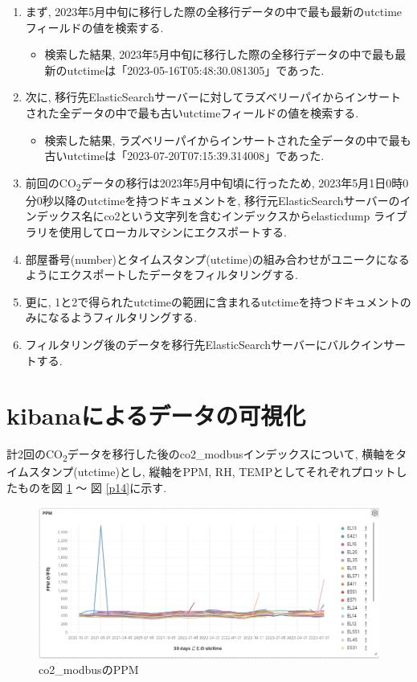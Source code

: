 \begin{enumerate}
    \item まず, 2023年5月中旬に移行した際の全移行データの中で最も最新のutctimeフィールドの値を検索する.
          \begin{itemize}
              \item 検索した結果, 2023年5月中旬に移行した際の全移行データの中で最も最新のutctimeは「2023-05-16T05:48:30.081305」であった.
          \end{itemize}
    \item 次に, 移行先ElasticSearchサーバーに対してラズベリーパイからインサートされた全データの中で最も古いutctimeフィールドの値を検索する.
          \begin{itemize}
              \item 検索した結果, ラズベリーパイからインサートされた全データの中で最も古いutctimeは「2023-07-20T07:15:39.314008」であった.
          \end{itemize}
    \item 前回のCO\textsubscript{2}データの移行は2023年5月中旬頃に行ったため, 2023年5月1日0時0分0秒以降のutctimeを持つドキュメントを, 移行元ElasticSearchサーバーのインデックス名にco2という文字列を含むインデックスからelasticdump \cite{1}ライブラリを使用してローカルマシンにエクスポートする.
    \item 部屋番号(number)とタイムスタンプ(utctime)の組み合わせがユニークになるようにエクスポートしたデータをフィルタリングする.
    \item 更に, 1と2で得られたutctimeの範囲に含まれるutctimeを持つドキュメントのみになるようフィルタリングする.
    \item フィルタリング後のデータを移行先ElasticSearchサーバーにバルクインサートする.
\end{enumerate}

\section{kibanaによるデータの可視化}

計2回のCO\textsubscript{2}データを移行した後のco2\_modbusインデックスについて, 横軸をタイムスタンプ(utctime)とし, 縦軸をPPM, RH, TEMPとしてそれぞれプロットしたものを図 \ref{p12} 〜 図 \ref{p14}に示す.

\begin{figure}
    \begin{center}
        \includegraphics[width=160mm]{sotu/figure/ppm.png}
        \caption{co2\_modbusのPPM}
        \label{p12}
    \end{center}
\end{figure}

